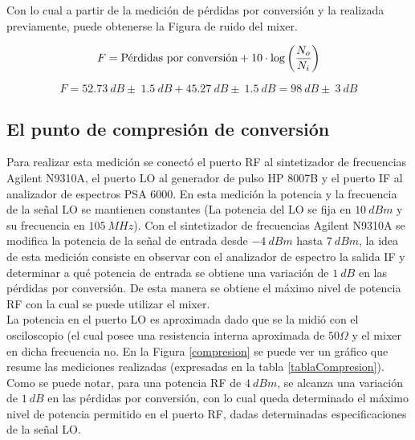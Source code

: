 \documentclass[a4paper,10pt]{article}
\begin{document}
	\indent Con lo cual a partir de la medici\'on de p\'erdidas por conversi\'on
	y la realizada previamente, puede obtenerse la Figura de ruido del mixer.
	
	$$F=\textmd{P\'erdidas por conversi\'on}+10\cdot\log\left(\frac{N_o}{N_i}
	\right)$$
	
	$$F=52.73~dB\pm~1.5~dB+45.27~dB\pm~1.5~dB=98~dB\pm~3~dB$$
	
	\subsection{El punto de compresi\'on de conversi\'on}
	\indent Para realizar esta medici\'on se conect\'o el puerto RF al 
	sintetizador de frecuencias Agilent N9310A, el puerto LO al generador de 
	pulso HP 8007B y el puerto IF al analizador de espectros PSA 6000. En esta 
	medici\'on la potencia y la frecuencia de la se\~nal LO se mantienen 
	constantes (La potencia del LO se fija en $10~dBm$ y su frecuencia en 
	$105~MHz$). Con el sintetizador de frecuencias Agilent N9310A se modifica la
	potencia de la se\~nal de entrada desde $-4~dBm$ hasta $7~dBm$, la idea de 
	esta medici\'on consiste en observar con el analizador de espectro la salida
	IF y determinar a qu\'e potencia de entrada se obtiene una variaci\'on de 
	$1~dB$ en las p\'erdidas por conversi\'on. De esta manera se obtiene el 
	m\'aximo nivel de potencia RF con la cual se puede utilizar el mixer. \\
	\indent La potencia en el puerto LO es aproximada dado que se la midió con 
	el osciloscopio (el cual posee una resistencia interna aproximada de $50 
	\Omega$  y el mixer en dicha frecuencia no.
	\indent En la Figura \ref{compresion} se puede ver un gr\'afico que resume 
	las mediciones realizadas (expresadas en la tabla \ref{tablaCompresion}). 
	Como se puede notar, para una potencia RF de $4~dBm$, se alcanza una 
	variaci\'on de $1~dB$ en las p\'erdidas por conversi\'on, con lo cual queda 
	determinado el m\'aximo nivel de potencia permitido en el puerto RF, dadas 
	determinadas especificaciones de la se\~nal LO.
\end{document}
